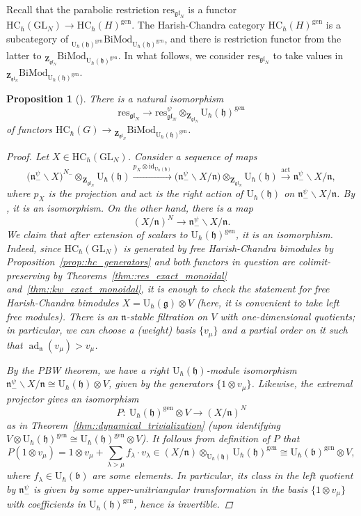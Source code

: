 \documentclass[10pt,a4paper]{amsart}
\numberwithin{equation}{section}
\newtheorem{Proposition}[Theorem]{Proposition}
{ \theoremstyle{definition}
	\newtheorem{Definition}[Theorem]{Definition}
	\newtheorem{Note}[Theorem]{Note}
	\newtheorem{Example}[Theorem]{Example}
	\newtheorem{Remark}[Theorem]{Remark} }
\newcommand{\U}{\mathrm{U}_{\hbar}}
\newcommand{\Z}{\mathbf{Z}}
\newcommand{\GL}{\mathrm{GL}}
\renewcommand{\b}{\mathfrak{b}}
\newcommand{\g}{\mathfrak{g}}
\newcommand{\h}{\mathfrak{h}}
\newcommand{\n}{\mathfrak{n}}
\newcommand{\act}{\mathrm{act}}
\DeclareMathOperator{\ad}{ad}
\newcommand{\BiMod}[2]{{}_{#1}\mathrm{BiMod}_{#2}}
\newcommand{\gen}{\mathrm{gen}}
\newcommand{\HC}{\mathrm{HC}_{\hbar}}
\newcommand{\id}{\mathrm{id}}
\newcommand{\res}{\mathrm{res}}
\newcommand{\gl}{\mathfrak{gl}}
\begin{document}
	Recall that the parabolic restriction $\res_{\gl_N}$ is a functor $\HC(\GL_N) \rightarrow \HC(H)^{\gen}$. The Harish-Chandra category $\HC(H)^{\gen}$ is a subcategory of $\BiMod{\U(\h)^{\gen}}{\U(\h)^{\gen}}$, and there is restriction functor from the latter to $\BiMod{\Z_{\gl_N}}{\U(\h)^{\gen}}$. In what follows, we consider $\res_{\gl_N}$ to take values in $\BiMod{\Z_{\gl_N}}{\U(\h)^{\gen}}$.
	\begin{Proposition}[{\cite[Corollary 2.7.7]{Kalmykov}}]
		\label{prop::two_res_iso}
		There is a natural isomorphism
		\[
		\res_{\gl_N} \rightarrow \res_{\gl_N}^{\psi} \otimes_{\Z_{\gl_N}} \U(\h)^{\gen}
		\]
		of functors $\HC(G) \rightarrow \BiMod{\Z_{\gl_N}}{\U(\h)^{\gen}}$.
		\begin{proof}
			Let $X\in \HC(\GL_N)$. Consider a sequence of maps
			\begin{equation}
				\label{eq::two_res_comp}
				\bigl(\n_-^{\psi} \backslash X\bigr)^{N_-} \otimes_{\Z_{\gl_N}} \U(\h) \xrightarrow{p_X \otimes \id_{\U(\h)}} \bigl(\n_-^{\psi} \backslash X / \n\bigr) \otimes_{\Z_{\gl_N}} \U(\h) \xrightarrow{\act} \n_-^{\psi} \backslash X / \n,
			\end{equation}
			where $p_X$ is the projection and $\act$ is the right action of $\U(\h)$ on $\n_-^{\psi} \backslash X / \n$. By \cite[Lemma~6.2.1]{GinzburgKazhdan}, it is an isomorphism. On the other hand, there is a map
			\begin{equation}
				\label{eq::two_res_invert}
				(X/\n)^{N} \rightarrow \n_-^{\psi} \backslash X / \n.
			\end{equation}
			We claim that after extension of scalars to $\U(\h)^{\gen}$, it is an isomorphism. Indeed, since $\HC(\GL_N)$ is generated by free Harish-Chandra bimodules by Proposition~\ref{prop::hc_generators} and both functors in question are colimit-preserving by Theorems~\ref{thm::res_exact_monoidal} and~\ref{thm::kw_exact_monoidal}, it is enough to check the statement for free Harish-Chandra bimodules $X = \U(\g) \otimes V$ (here, it is convenient to take \emph{left} free modules). There is an $\n$-stable filtration on $V$ with one-dimensional quotients; in particular, we can choose a (weight) basis $\{v_{\mu}\}$ and a partial order on it such that $\ad_{\n}(v_{\mu}) > v_{\mu}$.
			
			By the PBW theorem, we have a right $\U(\h)$-module isomorphism
$
			\n_-^{\psi} \backslash X /\n \cong \U(\h) \otimes V$,
			given by the generators $\{ 1\otimes v_{\mu}\}$. Likewise, the extremal projector gives an isomorphism
			\[
			P\colon\ \U(\h)^{\gen} \otimes V \rightarrow (X/\n)^{N}
			\]
			as in Theorem~\ref{thm::dynamical_trivialization} (upon identifying $V \otimes \U(\h)^{\gen} \cong \U(\h)^{\gen} \otimes V$). It follows from definition of $P$ that
			\[
			P(1\otimes v_{\mu}) = 1\otimes v_{\mu} + \sum_{\lambda > \mu} f_{\lambda} \cdot v_{\lambda} \in (X/\n) \otimes_{\U(\h)} \U(\h)^{\gen} \cong \U(\b)^{\gen} \otimes V,
			\]
			where $f_{\lambda} \in \U(\b)$ are some elements. In particular, its class in the left quotient by $\n_-^{\psi}$ is given by some upper-unitriangular transformation in the basis $\{1\otimes v_{\mu}\}$ with coefficients in $\U(\h)^{\gen}$, hence is invertible.
			

\end{proof}
\end{Proposition}
\end{document}
